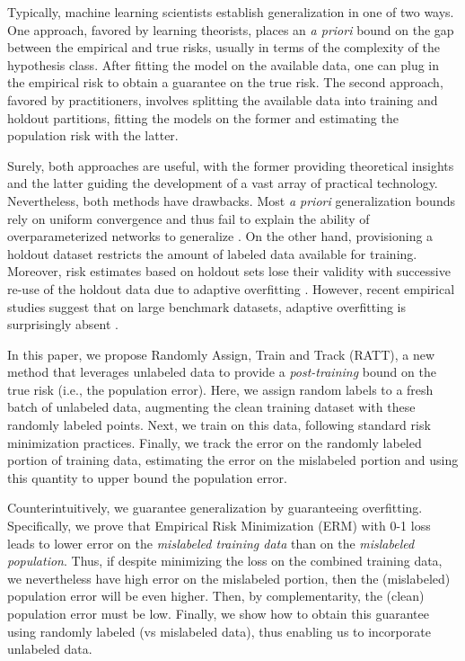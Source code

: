 Typically, machine learning scientists
establish generalization in one of two ways.
One approach, favored by learning theorists,
places an \emph{a priori} bound on the gap 
between the empirical and true risks,
usually in terms of the complexity 
of the hypothesis class.
After fitting the model on the available data,
one can plug in the empirical risk 
to obtain a guarantee on the true risk. 
The second approach, favored by practitioners,
involves splitting the available data
into training and holdout partitions,
fitting the models on the former
and estimating the population risk with the latter.

Surely, both approaches are useful,
with the former providing theoretical insights 
and the latter guiding the development 
of a vast array of practical technology.
Nevertheless, both methods have drawbacks.
Most \emph{a priori} generalization bounds 
rely on uniform convergence 
and thus fail to explain the ability 
of overparameterized networks to generalize
\citep{zhang2016understanding,nagarajan2019uniform}. 
On the other hand, 
provisioning a holdout dataset 
restricts the amount of labeled data 
available for training.
Moreover, risk estimates based on holdout sets 
lose their validity 
with successive re-use of the holdout data
due to adaptive overfitting 
\citep{murphy2012machine,dwork2015preserving,blum2015ladder}.
However, recent empirical studies suggest
that on large benchmark datasets,
adaptive overfitting is surprisingly absent
\citep{recht2019imagenet}.



In this paper, we propose
Randomly Assign, Train and Track (RATT), 
a new method that leverages unlabeled data 
to provide a \emph{post-training} 
bound on the true risk 
(i.e., the population error).
Here, we assign random labels 
to a fresh batch of unlabeled data, 
augmenting the clean training dataset
with these randomly labeled points. 
Next, we train on this data, 
following standard risk minimization practices. 
Finally, we track the error
on the randomly labeled 
portion of training data,
estimating the error 
on the mislabeled portion
and using this quantity 
to upper bound the population error.

Counterintuitively, 
we guarantee generalization 
by guaranteeing overfitting.
Specifically, we prove that 
Empirical Risk Minimization (ERM) 
with 0-1 loss leads to lower error 
on the \emph{mislabeled training data}
than on the \emph{mislabeled population}.
Thus, if despite minimizing the loss 
on the combined training data,
we nevertheless have high error 
on the mislabeled portion,
then the (mislabeled) population error will be even higher. 
Then, by complementarity, 
the (clean) population error must be low.
Finally, we show how to obtain this guarantee
using randomly labeled (vs mislabeled data),
thus enabling us to incorporate unlabeled data. 


